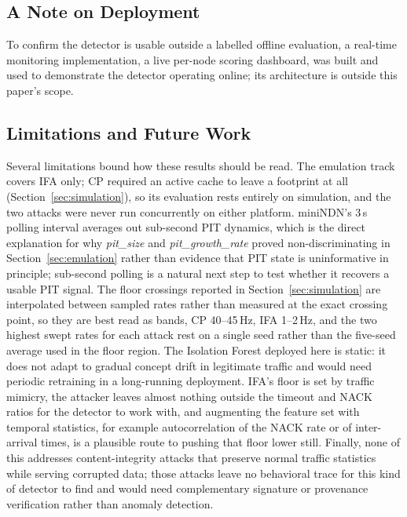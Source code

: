 \subsection{A Note on Deployment}

To confirm the detector is usable outside a labelled offline evaluation, a real-time monitoring implementation, a live per-node scoring dashboard, was built and used to demonstrate the detector operating online; its architecture is outside this paper's scope.

\subsection{Limitations and Future Work}

Several limitations bound how these results should be read. The emulation track covers IFA only; CP required an active cache to leave a footprint at all (Section~\ref{sec:simulation}), so its evaluation rests entirely on simulation, and the two attacks were never run concurrently on either platform. miniNDN's 3\,s polling interval averages out sub-second PIT dynamics, which is the direct explanation for why \textit{pit\_size} and \textit{pit\_growth\_rate} proved non-discriminating in Section~\ref{sec:emulation} rather than evidence that PIT state is uninformative in principle; sub-second polling is a natural next step to test whether it recovers a usable PIT signal. The floor crossings reported in Section~\ref{sec:simulation} are interpolated between sampled rates rather than measured at the exact crossing point, so they are best read as bands, CP 40--45\,Hz, IFA 1--2\,Hz, and the two highest swept rates for each attack rest on a single seed rather than the five-seed average used in the floor region. The Isolation Forest deployed here is static: it does not adapt to gradual concept drift in legitimate traffic and would need periodic retraining in a long-running deployment. IFA's floor is set by traffic mimicry, the attacker leaves almost nothing outside the timeout and NACK ratios for the detector to work with, and augmenting the feature set with temporal statistics, for example autocorrelation of the NACK rate or of inter-arrival times, is a plausible route to pushing that floor lower still. Finally, none of this addresses content-integrity attacks that preserve normal traffic statistics while serving corrupted data; those attacks leave no behavioral trace for this kind of detector to find and would need complementary signature or provenance verification rather than anomaly detection.
